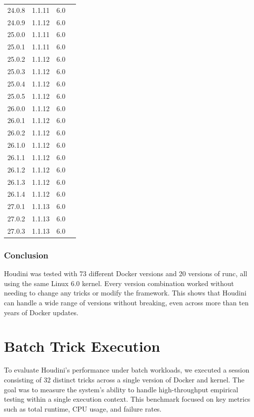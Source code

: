 \documentclass[12pt]{report}
\newcommand{\cmark}{\ding{51}} %
\begin{document}
\begin{doublespace}
{\begin{longtable}{|p{4cm}|p{3cm}||p{3cm}|p{2cm}|}
24.0.8 & 1.1.11 & 6.0 & \cmark \\
24.0.9 & 1.1.12 & 6.0 & \cmark \\
25.0.0 & 1.1.11 & 6.0 & \cmark \\
25.0.1 & 1.1.11 & 6.0 & \cmark \\
25.0.2 & 1.1.12 & 6.0 & \cmark \\
25.0.3 & 1.1.12 & 6.0 & \cmark \\
25.0.4 & 1.1.12 & 6.0 & \cmark \\
25.0.5 & 1.1.12 & 6.0 & \cmark \\
26.0.0 & 1.1.12 & 6.0 & \cmark \\
26.0.1 & 1.1.12 & 6.0 & \cmark \\
26.0.2 & 1.1.12 & 6.0 & \cmark \\
26.1.0 & 1.1.12 & 6.0 & \cmark \\
26.1.1 & 1.1.12 & 6.0 & \cmark \\
26.1.2 & 1.1.12 & 6.0 & \cmark \\
26.1.3 & 1.1.12 & 6.0 & \cmark \\
26.1.4 & 1.1.12 & 6.0 & \cmark \\
27.0.1 & 1.1.13 & 6.0 & \cmark \\
27.0.2 & 1.1.13 & 6.0 & \cmark \\
27.0.3 & 1.1.13 & 6.0 & \cmark \\
\end{longtable}
}

\subsubsection{Conclusion}

Houdini was tested with 73 different Docker versions and 20 versions of runc, all using the same Linux 6.0 kernel. Every version combination worked without needing to change any tricks or modify the framework. This shows that Houdini can handle a wide range of versions without breaking, even across more than ten years of Docker updates.



\section{Batch Trick Execution}

To evaluate Houdini’s performance under batch workloads, we executed a session consisting of 32 distinct tricks across a single version of Docker and kernel. The goal was to measure the system's ability to handle high-throughput empirical testing within a single execution context. This benchmark focused on key metrics such as total runtime, CPU usage, and failure rates.


\end{doublespace}
\end{document}
